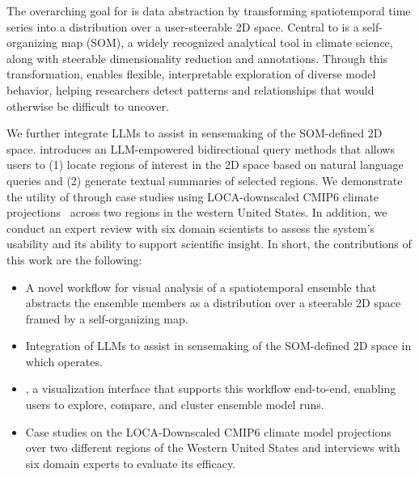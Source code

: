 The overarching goal for \ClimateSOM is data abstraction by transforming spatiotemporal time series into a distribution over a user-steerable 2D space.
%
Central to \ClimateSOM is a self-organizing map (SOM)\cite{kohonen_self-organizing_1990}, a widely recognized analytical tool in climate science, along with steerable dimensionality reduction and annotations.
%
%
Through this transformation, \ClimateSOM enables flexible, interpretable exploration of diverse model behavior, helping researchers detect patterns and relationships that would otherwise be difficult to uncover.

We further integrate LLMs to assist in sensemaking of the SOM-defined 2D space.
%
\ClimateSOM introduces an LLM-empowered bidirectional query methods that allows users to (1) locate regions of interest in the 2D space based on natural language queries and (2) generate textual summaries of selected regions.
%
We demonstrate the utility of \ClimateSOM through case studies using LOCA-downscaled CMIP6 climate projections~\cite{pierce2023future} across two regions in the western United States. In addition, we conduct an expert review with six domain scientists to assess the system’s usability and its ability to support scientific insight.
%
In short, the contributions of this work are the following:
\begin{itemize}[noitemsep, topsep=0pt]
    \item A novel workflow for visual analysis of a spatiotemporal ensemble that abstracts the ensemble members as a distribution over a steerable 2D space framed by a self-organizing map.
    \item Integration of LLMs to assist in sensemaking of the SOM-defined 2D space in which \ClimateSOM operates.
    \item \ClimateSOM, a visualization interface that supports this workflow end-to-end, enabling users to explore, compare, and cluster ensemble model runs.
    \item Case studies on the LOCA-Downscaled CMIP6 climate model projections over two different regions of the Western United States and interviews with six domain experts to evaluate its efficacy.
\end{itemize}


